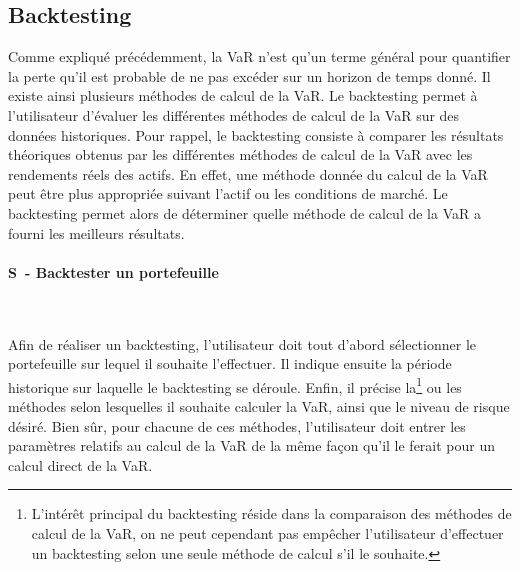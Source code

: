 \documentclass[a4paper]{report}
\newcommand\specification[1]{\addtocounter{cptspec}{1}\paragraph{S\thecptspec ~-  #1}~\par}
\newcounter{cptspec}
\begin{document}
\subsection{Backtesting}
Comme expliqué précédemment, la VaR n'est qu'un terme général pour quantifier la perte qu’il est probable de ne pas excéder sur un horizon de temps donné.
Il existe ainsi plusieurs méthodes de calcul de la VaR.
Le backtesting permet à l’utilisateur d’évaluer les différentes méthodes de calcul de la VaR sur des données historiques.
Pour rappel, le backtesting consiste à comparer les résultats théoriques obtenus par les différentes méthodes de calcul de la VaR avec les rendements réels des actifs.
En effet, une méthode donnée du calcul de la VaR peut être plus appropriée suivant l'actif ou les conditions de marché.
Le backtesting permet alors de déterminer quelle méthode de calcul de la VaR a fourni les meilleurs résultats.

\specification{Backtester un portefeuille}
Afin de réaliser un backtesting, l’utilisateur doit tout d’abord sélectionner le portefeuille sur lequel il souhaite l'effectuer.
Il indique ensuite la période historique sur laquelle le backtesting se déroule.
Enfin, il précise la\footnote{L'intérêt principal du backtesting réside dans la comparaison des méthodes de calcul de la VaR, on ne peut cependant pas empêcher l'utilisateur d'effectuer un backtesting selon une seule méthode de calcul s'il le souhaite.} ou les méthodes selon lesquelles il souhaite calculer la VaR, ainsi que le niveau de risque désiré.
Bien sûr, pour chacune de ces méthodes, l'utilisateur doit entrer les paramètres relatifs au calcul de la VaR de la même façon qu'il le ferait pour un calcul direct de la VaR.
\end{document}
